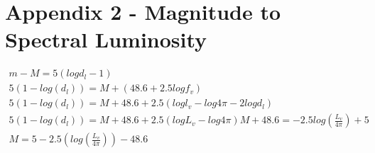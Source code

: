 \section{Appendix 2 - Magnitude to Spectral Luminosity}
\begin{align}
m-M=5(log d_l - 1)\\
5(1-log (d_l))= M + (48.6+2.5log f_v) \\
5(1-log (d_l))= M + 48.6 + 2.5(log l_v - log 4\pi - 2 log d_l) \\
5(1-log (d_l))= M+48.6 + 2.5(log L_v - log 4\pi)
M+48.6=-2.5 log (\frac{L_v}{4\pi})+5 \\
M=5-2.5(log (\frac{L_v}{4\pi})) - 48.6
\end{align}














